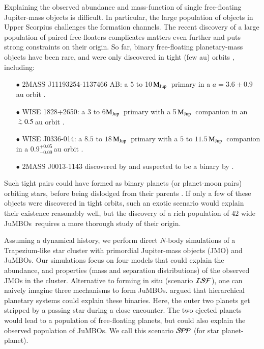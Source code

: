 \documentclass[submission,phys]{lib/SciPost}
\newcommand{\MJup}{\mbox{$\mathrm{{M}}_{\rm Jup}$}}
\def\apgt{\ {\raise-.5ex\hbox{$\buildrel>\over\sim$}}\ }
\newcommand{\jumbos}{\mbox{JuMBOs}}
\begin{document}
Explaining the observed abundance and mass-function of single
free-floating Jupiter-mass objects is difficult.  In particular, the
large population of objects in Upper Scorpius challenges the formation
channels. The recent discovery of a large population of paired
free-floaters complicates matters even further and puts strong
constraints on their origin. So far, binary free-floating
planetary-mass objects have been rare, and were only discovered in tight
(few au) orbits \cite{2021ApJS..253....7K}, including:  
\begin{itemize}
\item[$\bullet$]2MASS J11193254-1137466 AB: a $5$ to 10\,\MJup\,
  primary in a $a=3.6\pm0.9$\,au orbit \cite{2017ApJ...843L...4B}.
\item[$\bullet$]WISE 1828+2650: a 3 to 6\MJup\, primary with a
  5\,\MJup\ companion in an $\apgt 0.5$\,au orbit
  \cite{2013ApJ...764..101B}.
\item[$\bullet$] WISE J0336-014: a $8.5$ to
  $18$\,\MJup\ primary with a $5$ to $11.5$\,\MJup\, companion in a
  $0.9^{+0.05}_{-0.09}$\,au orbit \cite{2023ApJ...947L..30C}.
\item[$\bullet$]2MASS J0013-1143 discovered by \cite{2017AJ....154..112K} and
  suspected to be a binary by \cite{2019A&A...629A.145E}.
\end{itemize}

Such tight pairs could have formed as binary planets (or planet-moon
pairs) orbiting stars, before being dislodged from their parents
\cite{2016ApJ...819..125C}.  If only a few of these objects were
discovered in tight orbits, such an exotic scenario would explain
their existence reasonably well, but the discovery of a rich
population of $42$ wide \jumbos\, \cite{2023arXiv231001231P} requires
a more thorough study of their origin.

Assuming a dynamical history, we perform direct $N$-body simulations of a 
Trapezium-like star cluster with primordial Jupiter-mass objects (JMO) and \jumbos. 
Our simulations focus on four models that could explain the abundance,
and properties (mass and separation distributions) of the observed JMOs in the
cluster. Alternative to forming in situ (scenario ${\cal ISF}$), 
one can naively imagine three mechanisms to
form \jumbos. \cite{2023arXiv231006016W} argued that hierarchical planetary 
systems could explain these binaries. Here, the
outer two planets get stripped by a passing star during a close
encounter. The two ejected planets would lead to a population of free-floating planets, 
but could also explain the observed population of
\jumbos.  We call this scenario ${\cal SPP}$ (for star planet-planet).
\end{document}
